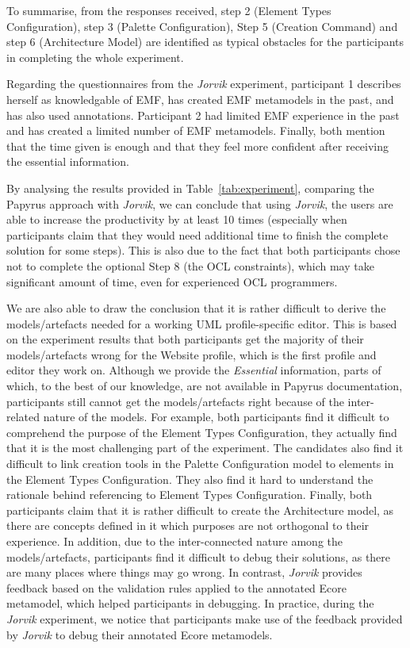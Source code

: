 To summarise, from the responses received, step 2 (Element Types Configuration), step 3 (Palette Configuration), Step 5 (Creation Command) and step 6 (Architecture Model) are identified as typical obstacles for the participants in completing the whole experiment. 

Regarding the questionnaires from the \textit{Jorvik} experiment, participant 1 describes herself as knowledgable of EMF, has created EMF metamodels in the past, and has also used annotations. 
Participant 2 had limited EMF experience in the past and has created a limited number of EMF metamodels. 
Finally, both mention that the time given is enough and that they feel more confident after receiving the essential information.

By analysing the results provided in Table~\ref{tab:experiment}, comparing the Papyrus approach with \textit{Jorvik}, we can conclude that using \textit{Jorvik}, the users are able to increase the productivity by at least 10 times (especially when participants claim that they would need additional time to finish the complete solution for some steps). 
This is also due to the fact that both participants chose not to complete the optional Step 8 (the OCL constraints), which may take significant amount of time, even for experienced OCL programmers.

We are also able to draw the conclusion that it is rather difficult to derive the models/artefacts needed for a working UML profile-specific editor. 
This is based on the experiment results that both participants get the majority of their models/artefacts wrong for the Website profile, which is the first profile and editor they work on.
Although we provide the \textit{Essential} information, parts of which, to the best of our knowledge, are not available in Papyrus documentation, participants still cannot get the models/artefacts right because of the inter-related nature of the models.
For example, both participants find it difficult to comprehend the purpose of the Element Types Configuration, they actually find that it is the most challenging part of the experiment.
The candidates also find it difficult to link creation tools in the Palette Configuration model to elements in the Element Types Configuration. 
They also find it hard to understand the rationale behind referencing to Element Types Configuration.
Finally, both participants claim that it is rather difficult to create the Architecture model, as there are concepts defined in it which purposes are not orthogonal to their experience.
In addition, due to the inter-connected nature among the models/artefacts, participants find it difficult to debug their solutions, as there are many places where things may go wrong.
In contrast, \textit{Jorvik} provides feedback based on the validation rules applied to the annotated Ecore metamodel, which helped participants in debugging.
In practice, during the \textit{Jorvik} experiment, we notice that participants make use of the feedback provided by \textit{Jorvik} to debug their annotated Ecore metamodels.

